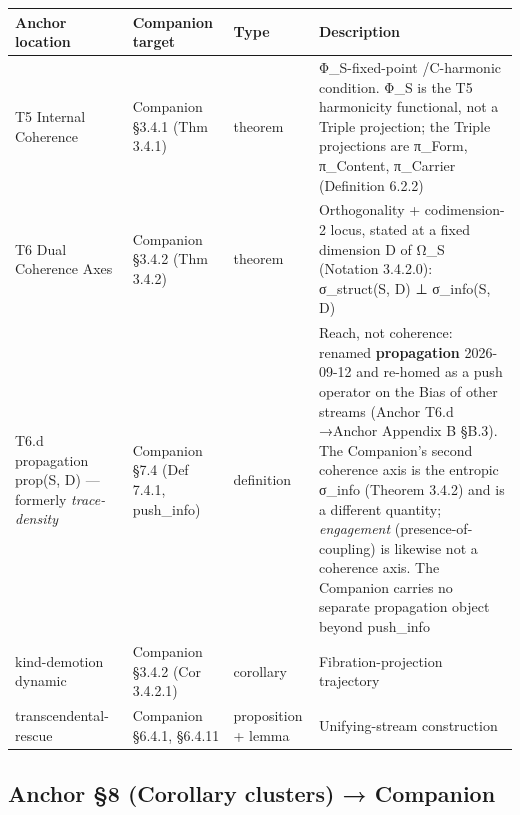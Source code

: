 \documentclass[11pt, openany]{book}
\begin{document}
\begingroup\setlength{\tabcolsep}{3pt}\renewcommand{\arraystretch}{1.15}\footnotesize
\begin{center}
\begin{tabular}{p{0.50in} p{0.50in} p{0.50in} p{2.78in}}
\toprule
Anchor location & Companion target & Type & Description \\
\midrule
T5 Internal Coherence & Companion §3.4.1 (Thm 3.4.1) & theorem & Φ\_\allowbreak{}S-fixed-point /\allowbreak  C-harmonic condition. Φ\_\allowbreak{}S is the T5 harmonicity functional, not a Triple projection; the Triple projections are π\_\allowbreak{}Form, π\_\allowbreak{}Content, π\_\allowbreak{}Carrier (Definition 6.2.2) \\
T6 Dual Coherence Axes & Companion §3.4.2 (Thm 3.4.2) & theorem & Orthogonality + codimension-2 locus, stated at a fixed dimension D of Ω\_\allowbreak{}S (Notation 3.4.2.0): σ\_\allowbreak{}struct(S, D) ⊥ σ\_\allowbreak{}info(S, D) \\
T6.d propagation prop(S, D) --- formerly \textit{trace-density} & Companion §7.4 (Def 7.4.1, push\_\allowbreak{}info) & definition & Reach, not coherence: renamed \textbf{propagation} 2026-09-12 and re-homed as a push operator on the Bias of other streams (Anchor T6.d →\allowbreak  Anchor Appendix B §B.3). The Companion's second coherence axis is the entropic σ\_\allowbreak{}info (Theorem 3.4.2) and is a different quantity; \textit{engagement} (presence-of-coupling) is likewise not a coherence axis. The Companion carries no separate propagation object beyond push\_\allowbreak{}info \\
kind-demotion dynamic & Companion §3.4.2 (Cor 3.4.2.1) & corollary & Fibration-projection trajectory \\
transcendental-rescue & Companion §6.4.1, §6.4.11 & proposition + lemma & Unifying-stream construction \\
\bottomrule
\end{tabular}
\end{center}
\endgroup
\subsection{Anchor §8 (Corollary clusters) → Companion}
\end{document}
